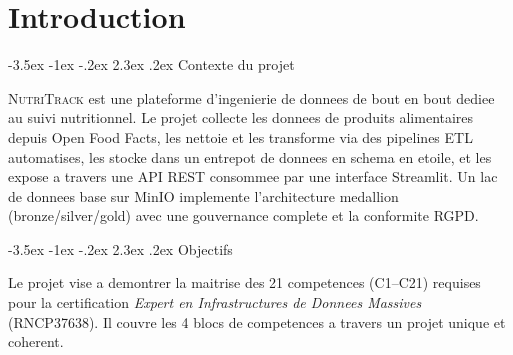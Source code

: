 \documentclass[a4paper,11pt,oneside,openany]{report}
\makeatletter
\renewcommand\section{\@startsection{section}{1}{\z@}%
  {-3.5ex \@plus -1ex \@minus -.2ex}%
  {2.3ex \@plus.2ex}%
  {\normalfont\Large\bfseries\color{ntgreen}}}
\newcommand{\nutritrack}{\textsc{NutriTrack}}
\newcommand{\off}{Open Food Facts}
\newcommand{\rgpd}{RGPD}
\makeatother
\begin{document}
\tableofcontents

\clearpage

\chapter{Introduction}
\label{ch:intro}

\section{Contexte du projet}

\nutritrack{} est une plateforme d'ingenierie de donnees de bout en bout
dediee au suivi nutritionnel. Le projet collecte les donnees de produits
alimentaires depuis \off{}, les nettoie et les transforme via des pipelines
ETL automatises, les stocke dans un entrepot de donnees en schema en etoile,
et les expose a travers une API REST consommee par une interface Streamlit.
Un lac de donnees base sur MinIO implemente l'architecture medallion
(bronze/silver/gold) avec une gouvernance complete et la conformite
\rgpd{}.

\begin{center}
\end{center}

\section{Objectifs}

Le projet vise a demontrer la maitrise des 21 competences (C1--C21)
requises pour la certification \textit{Expert en Infrastructures de
Donnees Massives} (RNCP37638). Il couvre les 4 blocs de competences
a travers un projet unique et coherent.
\end{document}

